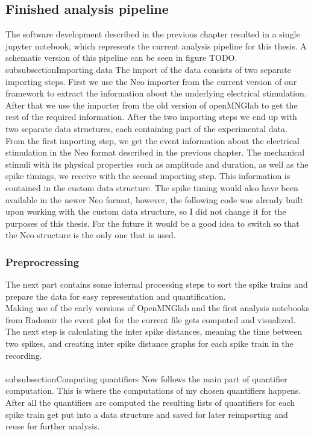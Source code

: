 \subsection{Finished analysis pipeline}
The software development described in the previous chapter resulted in a single jupyter notebook, which represents the current analysis pipeline for this thesis. A schematic version of this pipeline can be seen in figure TODO. 
\\subsubsection{Importing data}
The import of the data consists of two separate importing steps. First we use the Neo importer from the current version of our framework to extract the information about the underlying electrical stimulation. After that we use the importer from the old version of openMNGlab to get the rest of the required information. After the two importing steps we end up with two separate data structures, each containing part of the experimental data. From the first importing step, we get the event information about the electrical stimulation in the Neo format described in the previous chapter. The mechanical stimuli with its physical properties such as amplitude and duration, as well as the spike timings, we receive with the second importing step. This information is contained in the custom data structure. The spike timing would also have been available in the newer Neo format, however, the following code was already built upon working with the custom data structure, so I did not change it for the purposes of this thesis. For the future it would be a good idea to switch so that the Neo structure is the only one that is used.\\
\subsubsection{Preprocressing}
The next part contains some internal processing steps to sort the spike trains and prepare the data for easy representation and quantification.\\
Making use of the early versions of OpenMNGlab and the first analysis notebooks from Radomir the event plot for the current file gets computed and visualized. The next step is calculating the inter spike distances, meaning the time between two spikes, and creating inter spike distance graphs for each spike train in the recording.\\
\\subsubsection{Computing quantifiers}
Now follows the main part of quantifier computation. This is where the computations of my chosen quantifiers happens. After all the quantifiers are computed the resulting lists of quantifiers for each spike train get put into a data structure and saved for later reimporting and reuse for further analysis.\\
